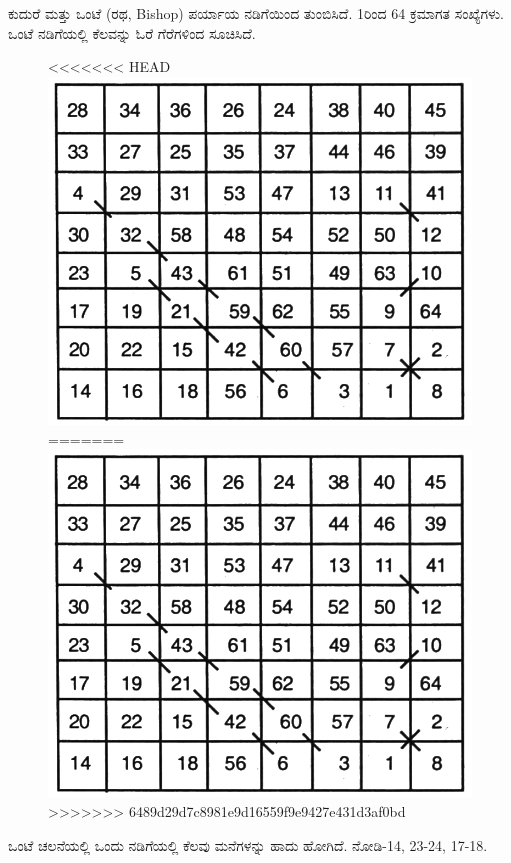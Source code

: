ಕುದುರೆ ಮತ್ತು ಒಂಟೆ (ರಥ, Bishop) ಪರ್ಯಾಯ ನಡಿಗೆಯಿಂದ ತುಂಬಿಸಿದೆ. 1ರಿಂದ 64 ಕ್ರಮಾಗತ ಸಂಖ್ಯೆಗಳು. ಒಂಟೆ ನಡಿಗೆಯಲ್ಲಿ ಕೆಲವನ್ನು ಓರೆ ಗೆರೆಗಳಿಂದ ಸೂಚಿಸಿದೆ.
\begin{figure}[H]
<<<<<<< HEAD
\includegraphics{src/figures/chap6/fig6-24.jpg}
=======
\includegraphics[scale=0.85]{src/figures/chap6/fig6.24.jpg}
>>>>>>> 6489d29d7c8981e9d16559f9e9427e431d3af0bd
\end{figure}

ಒಂಟೆ ಚಲನೆಯಲ್ಲಿ ಒಂದು ನಡಿಗೆಯಲ್ಲಿ ಕೆಲವು ಮನೆಗಳನ್ನು ಹಾದು ಹೋಗಿದೆ. ನೋಡಿ-14, 23-24, 17-18.
